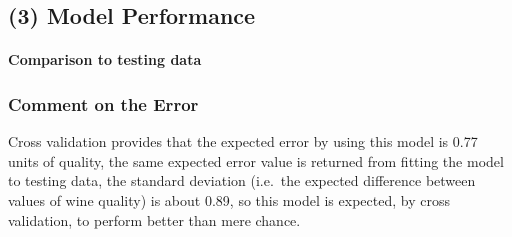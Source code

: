 \documentclass[12pt]{article}
\newenvironment{Shaded}{\begin{snugshade}}{\end{snugshade}}
\newcommand{\ControlFlowTok}[1]{\textcolor[rgb]{0.13,0.29,0.53}{\textbf{#1}}}
\newcommand{\DataTypeTok}[1]{\textcolor[rgb]{0.13,0.29,0.53}{#1}}
\newcommand{\DecValTok}[1]{\textcolor[rgb]{0.00,0.00,0.81}{#1}}
\newcommand{\KeywordTok}[1]{\textcolor[rgb]{0.13,0.29,0.53}{\textbf{#1}}}
\newcommand{\NormalTok}[1]{#1}
\newcommand{\OperatorTok}[1]{\textcolor[rgb]{0.81,0.36,0.00}{\textbf{#1}}}
\newcommand{\StringTok}[1]{\textcolor[rgb]{0.31,0.60,0.02}{#1}}
\let\oldparagraph\paragraph
\renewcommand{\paragraph}[1]{\oldparagraph{#1}\mbox{}}
\begin{document}
\hypertarget{model-performance}{%
\subsection{(3) Model Performance}\label{model-performance}}

\hypertarget{comparison-to-testing-data}{%
\paragraph{Comparison to testing
data}\label{comparison-to-testing-data}}

\begin{Shaded}
\end{Shaded}

\hypertarget{comment-on-the-error}{%
\subsubsection{Comment on the Error}\label{comment-on-the-error}}

Cross validation provides that the expected error by using this model is
0.77 units of quality, the same expected error value is returned from
fitting the model to testing data, the standard deviation (i.e.~the
expected difference between values of wine quality) is about 0.89, so
this model is expected, by cross validation, to perform better than mere
chance.
\end{document}
